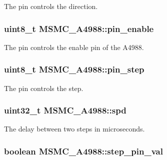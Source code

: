 The pin controls the direction. 

\hypertarget{class_m_s_m_c___a4988_a822c3db98367f3e60347a13d1d16170b}{
\subsubsection[{pin\+\_\+enable}]{\setlength{\rightskip}{0pt plus 5cm}uint8\+\_\+t M\+S\+M\+C\+\_\+\+A4988\+::pin\+\_\+enable\hspace{0.3cm}{\ttfamily [private]}}}\label{class_m_s_m_c___a4988_a822c3db98367f3e60347a13d1d16170b}


The pin controls the enable pin of the A4988. 

\hypertarget{class_m_s_m_c___a4988_a2ea61398ce88d1ee627b409a5965b478}{
\subsubsection[{pin\+\_\+step}]{\setlength{\rightskip}{0pt plus 5cm}uint8\+\_\+t M\+S\+M\+C\+\_\+\+A4988\+::pin\+\_\+step\hspace{0.3cm}{\ttfamily [private]}}}\label{class_m_s_m_c___a4988_a2ea61398ce88d1ee627b409a5965b478}


The pin controls the step. 

\hypertarget{class_m_s_m_c___a4988_a6453efb52d22739962c05b0d03f65aa7}{
\subsubsection[{spd}]{\setlength{\rightskip}{0pt plus 5cm}uint32\+\_\+t M\+S\+M\+C\+\_\+\+A4988\+::spd\hspace{0.3cm}{\ttfamily [private]}}}\label{class_m_s_m_c___a4988_a6453efb52d22739962c05b0d03f65aa7}


The delay between two steps in microseconds. 

\hypertarget{class_m_s_m_c___a4988_a1ec86b6286b8827eca6d5703a02f65fd}{
\subsubsection[{step\+\_\+pin\+\_\+val}]{\setlength{\rightskip}{0pt plus 5cm}boolean M\+S\+M\+C\+\_\+\+A4988\+::step\+\_\+pin\+\_\+val\hspace{0.3cm}{\ttfamily [private]}}}\label{class_m_s_m_c___a4988_a1ec86b6286b8827eca6d5703a02f65fd}


